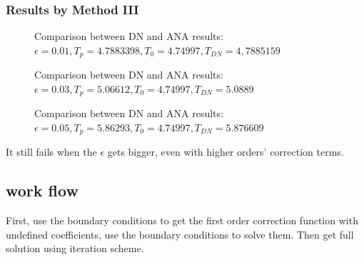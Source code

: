 \documentclass{article}
\begin{document}
\subsubsection{Results by Method III}
\begin{figure}[h]
	\caption{Comparison between DN and ANA results:$\epsilon=0.01,T_p=4.7883398,T_0=4.74997,T_{DN}=4,7885159$}
\end{figure}

\begin{figure}[h]
	\caption{Comparison between DN and ANA results:$\epsilon=0.03,T_p=5.06612,T_0=4.74997,T_{DN}=5.0889$}
\end{figure}

\begin{figure}[h]
	\caption{Comparison between DN and ANA results:$\epsilon=0.05,T_p=5.86293,T_0=4.74997,T_{DN}=5.876609$}
\end{figure}
It still fails when the $\epsilon$ gets bigger, even with higher orders' correction terms. 


\subsection{work flow}
First, use the boundary conditions to get the first order correction function with undefined coefficients, use the boundary conditions to solve them. Then get full solution using iteration scheme.
\clearpage


\end{document}
